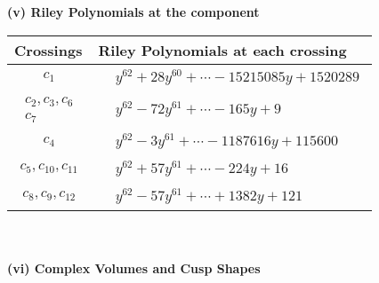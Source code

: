\documentclass[1p]{elsarticle_modified}
\theoremstyle{definition}
\begin{document}
\newpage\renewcommand{\arraystretch}{1}
\flushleft \textbf{(v) Riley Polynomials at the component}\newline \\
\begin{tabular}{m{50pt}|m{274pt}}
Crossings & \hspace{64pt}Riley Polynomials at each crossing \\
\hline $$\begin{aligned}c_{1}\end{aligned}$$&$\begin{aligned}
&y^{62}+28 y^{60}+\cdots-15215085 y+1520289
\end{aligned}$\\
\hline $$\begin{aligned}c_{2},c_{3},c_{6}\\c_{7}\end{aligned}$$&$\begin{aligned}
&y^{62}-72 y^{61}+\cdots-165 y+9
\end{aligned}$\\
\hline $$\begin{aligned}c_{4}\end{aligned}$$&$\begin{aligned}
&y^{62}-3 y^{61}+\cdots-1187616 y+115600
\end{aligned}$\\
\hline $$\begin{aligned}c_{5},c_{10},c_{11}\end{aligned}$$&$\begin{aligned}
&y^{62}+57 y^{61}+\cdots-224 y+16
\end{aligned}$\\
\hline $$\begin{aligned}c_{8},c_{9},c_{12}\end{aligned}$$&$\begin{aligned}
&y^{62}-57 y^{61}+\cdots+1382 y+121
\end{aligned}$\\
\hline
\end{tabular}\\~\\
\newpage\flushleft \textbf{(vi) Complex Volumes and Cusp Shapes}
\end{document}

